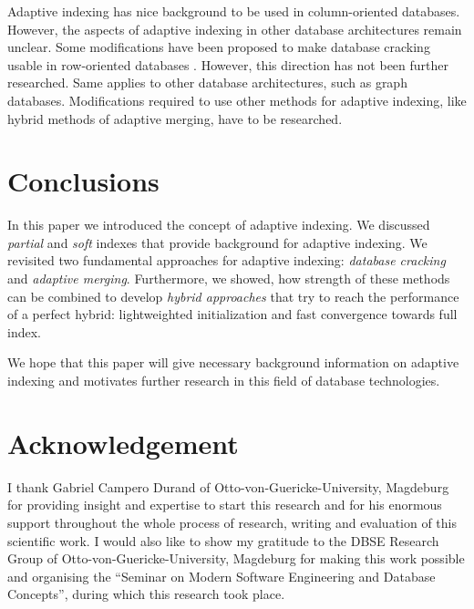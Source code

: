 \documentclass[10pt, conference, compsocconf]{IEEEtran}
\begin{document}
\begin{itemize}
\begin{enumerate}
Adaptive indexing has nice background to be used in column-oriented databases. However, the aspects of adaptive indexing in other database architectures remain unclear. Some modifications have been proposed to make database cracking usable in row-oriented databases \cite{cracking}. However, this direction has not been further researched. Same applies to other database architectures, such as graph databases. Modifications required to use other methods for adaptive indexing, like hybrid methods of adaptive merging, have to be researched.
\end{enumerate}
\end{itemize}


\section{Conclusions}
\label{sec:conc}
In this paper we introduced the concept of adaptive indexing. We discussed \emph{partial} and \emph{soft} indexes that provide background for adaptive indexing. We revisited two fundamental approaches for adaptive indexing: \emph{database cracking} and \emph{adaptive merging}. Furthermore, we showed, how strength of these methods can be combined to develop \emph{hybrid approaches} that try to reach the performance of a perfect hybrid: lightweighted initialization and fast convergence towards full index.

We hope that this paper will give necessary background information on adaptive indexing and motivates further research in this field of database technologies.

\section*{Acknowledgement}
I thank Gabriel Campero Durand of Otto-von-Guericke-University, Magdeburg for providing insight and expertise to start this research and for his enormous support throughout the whole process of research, writing and evaluation of this scientific work. I would also like to show my gratitude to the DBSE Research Group of Otto-von-Guericke-University, Magdeburg for making this work possible and organising the ``Seminar on Modern Software Engineering and Database Concepts'', during which this research took place.
\end{document}
